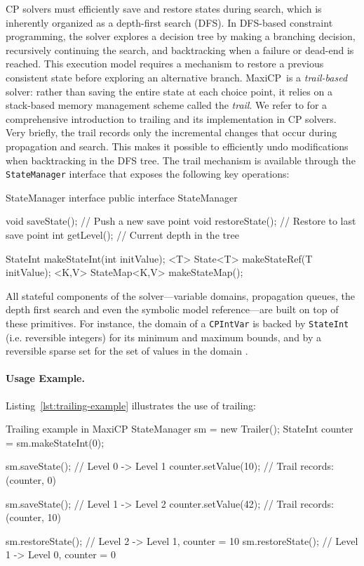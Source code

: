 \documentclass[11pt, a4paper]{scrartcl}
\newcommand{\maxicp}{\textsf{MaxiCP}}
\begin{document}
CP solvers must efficiently save and restore states during search, which is inherently organized as a depth-first search (DFS).
In DFS-based constraint programming, the solver explores a decision tree by making a branching decision, recursively continuing the search, and backtracking when a failure or dead-end is reached.
This execution model requires a mechanism to restore a previous consistent state before exploring an alternative branch.
\maxicp\ is a \emph{trail-based} solver: rather than saving the entire state at each choice point, it relies on a stack-based memory management scheme called the \emph{trail}.
We refer to \cite{Michel2021MiniCP} for a comprehensive introduction to trailing and its implementation in CP solvers.
Very briefly, the trail records only the incremental changes that occur during propagation and search.
This makes it possible to efficiently undo modifications when backtracking in the DFS tree.
The trail mechanism is available through the \texttt{StateManager} interface that exposes the following key operations:

\begin{codebox}{StateManager interface}
public interface StateManager {
    void saveState();       // Push a new save point
    void restoreState();    // Restore to last save point
    int getLevel();         // Current depth in the tree

    StateInt makeStateInt(int initValue);
    <T> State<T> makeStateRef(T initValue);
    <K,V> StateMap<K,V> makeStateMap();
}
\end{codebox}

All stateful components of the solver---variable domains, propagation queues, the depth first search and even the symbolic model reference---are built on top of these primitives.
For instance, the domain of a \texttt{CPIntVar} is backed by \texttt{StateInt} (i.e. reversible integers) for its minimum and maximum bounds,
and by a reversible sparse set for the set of values in the domain \cite{sparsets2013domain,Michel2021MiniCP}.

\paragraph{Usage Example.}
Listing~\ref{lst:trailing-example} illustrates the use of trailing:

\begin{codebox}[label={lst:trailing-example}]{Trailing example in MaxiCP}
StateManager sm = new Trailer();
StateInt counter = sm.makeStateInt(0);

sm.saveState();           // Level 0 -> Level 1
counter.setValue(10);     // Trail records: (counter, 0)

sm.saveState();           // Level 1 -> Level 2
counter.setValue(42);     // Trail records: (counter, 10)

sm.restoreState();        // Level 2 -> Level 1, counter = 10
sm.restoreState();        // Level 1 -> Level 0, counter = 0
\end{codebox}
\end{document}

